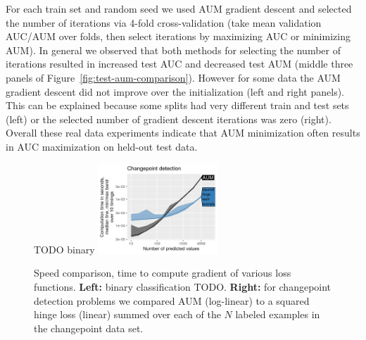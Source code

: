 \documentclass{article}
\begin{document}
For each train set and random seed we used AUM gradient descent and selected the number of iterations via 4-fold cross-validation (take mean validation AUC/AUM over folds, then select iterations by maximizing AUC or minimizing AUM).
In general we observed that both methods for selecting the number of iterations resulted in increased test AUC and decreased test AUM (middle three panels of Figure~\ref{fig:test-aum-comparison}). 
However for some data the AUM gradient descent did not improve over the initialization (left and right panels).
This can be explained because some splits had very different train and test sets (left) or 
the selected number of gradient descent iterations was zero
(right). 
Overall these real data experiments indicate that AUM minimization often results in AUC maximization on held-out test data.




\begin{figure}[t]
\vskip 0.2in
\begin{center}
TODO binary \includegraphics[width=0.4\textwidth]{figure-aum-grad-speed-random.png}
\vskip -0.5cm
\caption{
Speed comparison, time to compute gradient of various loss functions. \textbf{Left:} binary classification TODO. \textbf{Right:} for changepoint detection problems we compared AUM (log-linear) to a squared hinge loss (linear) summed over each of the $N$ labeled examples in the changepoint data set.
}
\label{fig:test-speed}
\end{center}
\vskip -0.2in
\end{figure}
\end{document}

